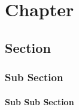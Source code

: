 \chapter{Chapter}
\lipsum[1]
\lipsum[5]

\section{Section}
\lipsum[2]
\lipsum[6]

\subsection{Sub Section}
\lipsum[3]
\lipsum[7]

\subsubsection{Sub Sub Section}
\lipsum[4]
\lipsum[8]